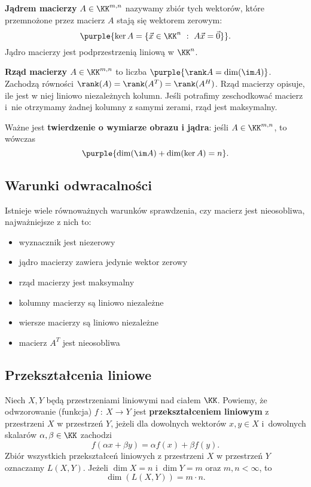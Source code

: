 \textbf{Jądrem macierzy} $A \in \KK^{m, n}$ nazywamy zbiór tych wektorów, które przemnożone przez macierz $A$ stają się wektorem zerowym:
$$
\purple{\ker A = \{\vec{x} \in \KK^n \ : \ A\vec{x}=\vec{0}  \}}.
$$
Jądro macierzy jest podprzestrzenią liniową w $\KK^n$.
\bigskip

\textbf{Rząd macierzy} $A\in\KK^{m,n}$ to liczba $\purple{\rank A=\dim(\im A)}$. Zachodzą równości $\rank(A)=\rank(A^T)=\rank(A^H)$. Rząd macierzy opisuje, ile jest w niej liniowo niezależnych kolumn. Jeśli potrafimy zeschodkować macierz i~nie otrzymamy żadnej kolumny z samymi zerami, rząd jest maksymalny.

Ważne jest \textbf{twierdzenie o wymiarze obrazu i jądra}: jeśli $A\in\KK^{m,n}$, to wówczas
$$
\purple{\dim(\im A) + \dim(\ker A) = n}.
$$

\subsection{Warunki odwracalności}

Istnieje wiele równoważnych warunków sprawdzenia, czy macierz jest nieosobliwa, najważniejsze z nich to:
\begin{itemize}
    \item wyznacznik jest niezerowy 
    \item jądro macierzy zawiera jedynie wektor zerowy
    \item rząd macierzy jest maksymalny
    \item kolumny macierzy są liniowo niezależne
    \item wiersze macierzy są liniowo niezależne
    \item macierz $A^T$ jest nieosobliwa
\end{itemize}

\subsection{Przekształcenia liniowe}
Niech $X, Y$ będą przestrzeniami liniowymi nad ciałem $\KK$. Powiemy, że odwzorowanie (funkcja) $f \ : \ X \to Y$ jest \textbf{przekształceniem liniowym} z przestrzeni $X$ w przestrzeń $Y$, jeżeli dla dowolnych wektorów $x,y\in X$ i~dowolnych skalarów $\alpha, \beta \in \KK$ zachodzi
$$
f(\alpha x + \beta y) = \alpha f(x) + \beta f(y).
$$
Zbiór wszystkich przekształceń liniowych z przestrzeni $X$ w przestrzeń $Y$ oznaczamy $L(X, Y).$ Jeżeli $\dim X=n$ i $\dim Y=m$ oraz $m,n< \infty$, to
$$
\dim(L(X,Y)) = m\cdot n.
$$

